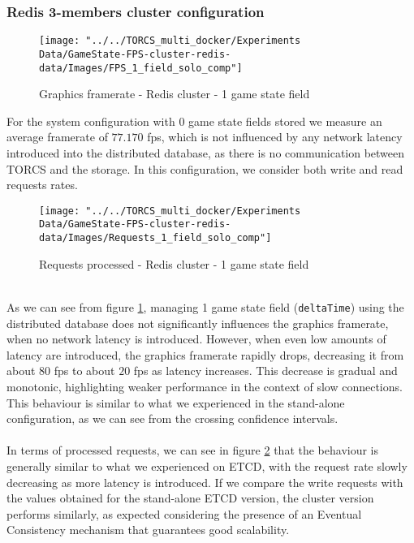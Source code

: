 \subsubsection{Redis 3-members cluster configuration}
\begin{figure}[h!]
	\centering
	\texttt{[image: "../../TORCS\_multi\_docker/Experiments Data/GameState-FPS-cluster-redis-data/Images/FPS\_1\_field\_solo\_comp"]}
	\caption[Graphics framerate - Redis cluster - 1 game state field]{Graphics framerate - Redis cluster - 1 game state field}
	\label{fig:fps-1-field-redis-cluster}
\end{figure}
For the system configuration with 0 game state fields stored we measure an average framerate of $77.170$ fps, which is not influenced by any network latency introduced into the distributed database, as there is no communication between TORCS and the storage. In this configuration, we consider both write and read requests rates. \\
\begin{figure}[h!]
	\centering
	\texttt{[image: "../../TORCS\_multi\_docker/Experiments Data/GameState-FPS-cluster-redis-data/Images/Requests\_1\_field\_solo\_comp"]}
	\caption[Requests processed - Redis cluster - 1 game state field]{Requests processed - Redis cluster - 1 game state field}
	\label{fig:requests-1-field-redis-cluster}
\end{figure}
\\ As we can see from figure \ref{fig:fps-1-field-redis-cluster}, managing 1 game state field (\texttt{deltaTime}) using the distributed database does not significantly influences the graphics framerate, when no network latency is introduced. However, when even low amounts of latency are introduced, the graphics framerate rapidly drops, decreasing it from about $80$ fps to about $20$ fps as latency increases. This decrease is gradual and monotonic, highlighting weaker performance in the context of slow connections. This behaviour is similar to what we experienced in the stand-alone configuration, as we can see from the crossing confidence intervals. \\ \\
In terms of processed requests, we can see in figure \ref{fig:requests-1-field-redis-cluster} that the behaviour is generally similar to what we experienced on ETCD, with the request rate slowly decreasing as more latency is introduced. If we compare the write requests with the values obtained for the stand-alone ETCD version, the cluster version performs similarly, as expected considering the presence of an Eventual Consistency mechanism that guarantees good scalability. \\
